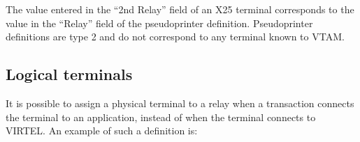\documentclass[letterpaper,10pt,english]{sphinxmanual}
\begin{document}
\sphinxAtStartPar
The value entered in the “2nd Relay” field of an X25 terminal corresponds to the value in the “Relay” field of the pseudo\sphinxhyphen{}printer definition. Pseudo\sphinxhyphen{}printer definitions are type 2 and do not correspond to any terminal known to VTAM.

\ignorespaces 

\subsection{Logical terminals}
\label{\detokenize{connectivity_guide:logical-terminals}}\label{\detokenize{connectivity_guide:index-151}}
\sphinxAtStartPar
It is possible to assign a physical terminal to a relay when a transaction connects the terminal to an application, instead of when the terminal connects to VIRTEL. An example of such a definition is:

\begin{sphinxVerbatim}[commandchars=\\\{\}]
  

                 

                     
\end{sphinxVerbatim}

\begin{sphinxVerbatim}[commandchars=\\\{\}]
      

                 

                 
                 
                 
\end{sphinxVerbatim}
\end{document}
